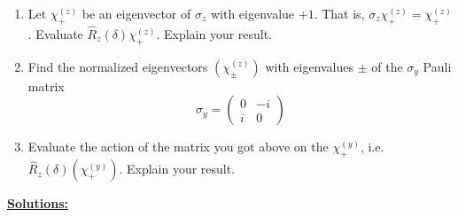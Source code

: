 \documentclass{article}
\begin{document}
\begin{dottedbox}
\begin{enumerate}[label=(\alph*)]
  \item Let $\chi_+^(z)$ be an eigenvector of $\sigma_z$ with eigenvalue $+1$. That is, $\sigma_z \chi_+^{(z)} = \chi_+^{(z)}$. Evaluate $\hat{R}_z(\delta) \chi_+^{(z)}$. Explain your result.
  
  \item Find the normalized eigenvectors $(\chi_{\pm}^{(z)})$ with eigenvalues $\pm$ of the $\sigma_y$ Pauli matrix
  \[ \sigma_y = \begin{pmatrix}
    0 & -i \\
    i & 0 
  \end{pmatrix} \]

  \item Evaluate the action of the matrix you got above on the $\chi_+^{(y)}$, i.e. $\hat{R}_z(\delta)(\chi_+^{(y)})$. Explain your result.
\end{enumerate}
\end{dottedbox}

\vskip 0.5cm
\underline{\textbf{Solutions:}} 
\end{document}
